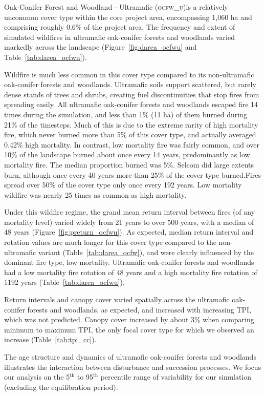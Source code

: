 Oak-Conifer Forest and Woodland - Ultramafic (\textsc{ocfw\_u})is a relatively uncommon cover type within the core project area, encompassing 1,060 ha and comprising roughly 0.6\% of the project area. The frequency and extent of simulated wildfires in ultramafic oak-conifer forests and woodlands varied markedly across the landscape (Figure~\ref{fig:darea_ocfwu} and Table~\ref{tab:darea_ocfwu}). 

Wildfire is much less common in this cover type compared to its non-ultramafic oak-conifer forests and woodlands. Ultramafic soils support scattered, but rarely dense stands of trees and shrubs, creating fuel discontinuities that stop fires from spreading easily. All ultramafic oak-conifer forests and woodlands escaped fire 14 times during the simulation, and less than 1\% (11 ha) of them burned during 21\% of the timesteps. Much of this is due to the extreme rarity of high mortality fire, which never burned more than 5\% of this cover type, and actually averaged 0.42\% high mortality. In contrast, low mortality fire was fairly common, and over 10\% of the landscape burned about once every 14 years, predominantly as low mortality fire. The median proportion burned was 5\%. Selcom did large extents burn, although once every 40 years more than 25\% of the cover type burned.Fires spread over 50\% of the cover type only once every 192 years. Low mortality wildfire was nearly 25 times as common as high mortality. 

Under this wildfire regime, the grand mean return interval between fires (of any mortality level) varied widely from 21 years to over 500 years, with a median of 48 years (Figure~\ref{fig:preturn_ocfwu}). As expected, median return interval and rotation values are much longer for this cover type compared to the non-ultramafic variant (Table~\ref{tab:darea_ocfw}), and were clearly influenced by the dominant fire type, low mortality. Ultramafic oak-conifer forests and woodlands had a low mortality fire rotation of 48 years and a high mortality fire rotation of 1192 years (Table~\ref{tab:darea_ocfwu}). 

Return intervals and canopy cover varied spatially across the ultramafic oak-conifer forests and woodlands, as expected, and increased with increasing TPI, which was not predicted. Canopy cover increased by about 3\% when comparing minimum to maximum TPI, the only focal cover type for which we observed an increase (Table~\ref{tab:tpi_cc}). 


The age structure and dynamics of ultramafic oak-conifer forests and woodlands illustrates the interaction between disturbance and succession processes. We focus our analysis on the 5$^{\text{th}}$ to 95$^{\text{th}}$ percentile range of variability for our simulation (excluding the equilibration period).

